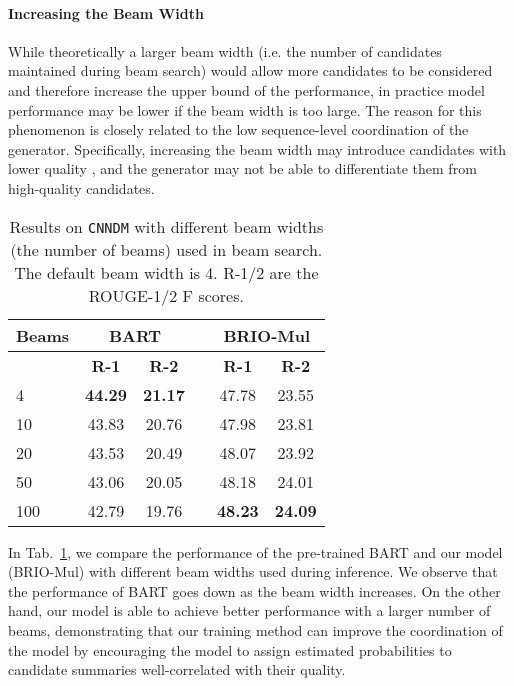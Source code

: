 \documentclass[11pt]{article}
\newcommand{\model}{BRIO\xspace}
\begin{document}
\paragraph{Increasing the Beam Width}

While theoretically a larger beam width (i.e. the number of candidates maintained during beam search) would allow more candidates to be considered and therefore increase the upper bound of the performance, in practice model performance may be lower if the beam width is too large.
The reason for this phenomenon is closely related to the low sequence-level coordination of the generator.
Specifically, increasing the beam width may introduce candidates with lower quality \citep{stahlberg-byrne-2019-nmt}, and the generator may not be able to differentiate them from high-quality candidates.

\begin{table}[t!]
\centering
\small
\begin{tabular}{lccccc}
\toprule
 \textbf{Beams} & \multicolumn{2}{c}{\textbf{BART}} & & \multicolumn{2}{c}{\textbf{\model-Mul}} \\
 \midrule
 & \textbf{R-1} & \textbf{R-2} & & \textbf{R-1} & \textbf{R-2} \\
\cmidrule{2-3} \cmidrule{5-6}

 4 & \textbf{44.29} & \textbf{21.17} &  & 47.78 & 23.55  \\
 10 & 43.83 & 20.76 &  & 47.98 & 23.81  \\
 20 & 43.53 & 20.49 & & 48.07 & 23.92  \\
 50 & 43.06 & 20.05 &  & 48.18 & 24.01 \\
 100 & 42.79 & 19.76 &  & \textbf{48.23} & \textbf{24.09} \\
\bottomrule
\end{tabular}
\caption{\label{tab:num_beams} Results on \texttt{CNNDM} with different beam widths (the number of beams) used in beam search.
The default beam width is 4.
R-1/2 are the ROUGE-1/2 F scores.
}
\end{table}

In Tab.~\ref{tab:num_beams}, we compare the performance of the pre-trained BART and our model (\model-Mul) with different beam widths used during inference.
We observe that the performance of BART goes down as the beam width increases.
On the other hand, our model is able to achieve better performance with a larger number of beams, demonstrating that our training method can improve the coordination of the model by encouraging the model to assign estimated probabilities to candidate summaries well-correlated with their quality.
\end{document}
